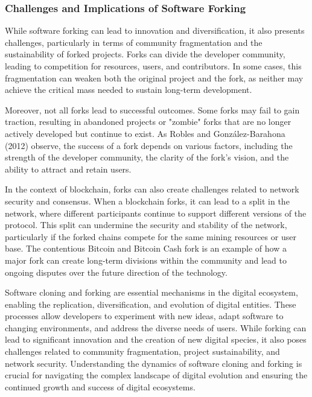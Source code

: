\documentclass[12pt,twoside]{article}
\begin{document}
\subsubsection{Challenges and Implications of Software Forking}

While software forking can lead to innovation and diversification, it also presents challenges, particularly in terms of community fragmentation and the sustainability of forked projects. Forks can divide the developer community, leading to competition for resources, users, and contributors. In some cases, this fragmentation can weaken both the original project and the fork, as neither may achieve the critical mass needed to sustain long-term development.

Moreover, not all forks lead to successful outcomes. Some forks may fail to gain traction, resulting in abandoned projects or "zombie" forks that are no longer actively developed but continue to exist. As Robles and González-Barahona (2012) observe, the success of a fork depends on various factors, including the strength of the developer community, the clarity of the fork's vision, and the ability to attract and retain users.

In the context of blockchain, forks can also create challenges related to network security and consensus. When a blockchain forks, it can lead to a split in the network, where different participants continue to support different versions of the protocol. This split can undermine the security and stability of the network, particularly if the forked chains compete for the same mining resources or user base. The contentious Bitcoin and Bitcoin Cash fork is an example of how a major fork can create long-term divisions within the community and lead to ongoing disputes over the future direction of the technology.

Software cloning and forking are essential mechanisms in the digital ecosystem, enabling the replication, diversification, and evolution of digital entities. These processes allow developers to experiment with new ideas, adapt software to changing environments, and address the diverse needs of users. While forking can lead to significant innovation and the creation of new digital species, it also poses challenges related to community fragmentation, project sustainability, and network security. Understanding the dynamics of software cloning and forking is crucial for navigating the complex landscape of digital evolution and ensuring the continued growth and success of digital ecosystems.
\end{document}
